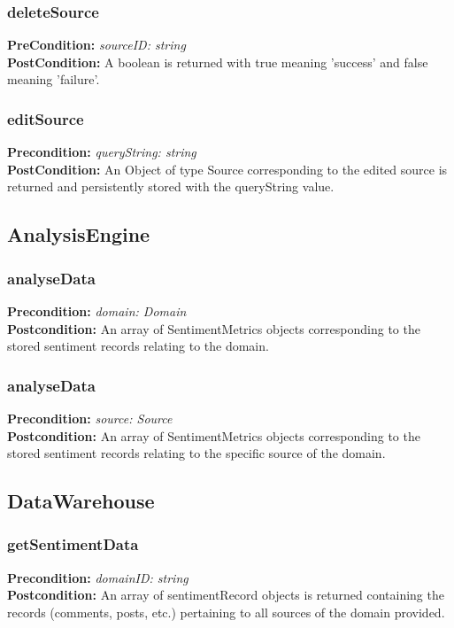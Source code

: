 \documentclass[12pt]{article}
\begin{document}
\subsubsection*{deleteSource}
\textbf{PreCondition:} \textit{sourceID: string} \\
\textbf{PostCondition:} A boolean is returned with true meaning 'success' and false meaning 'failure'.

\subsubsection*{editSource}
\textbf{Precondition:} \textit{queryString: string} \\
\textbf{PostCondition:} An Object of type Source corresponding to the edited source is returned and persistently stored with the queryString value.

\subsection{AnalysisEngine}

\subsubsection*{analyseData}
\textbf{Precondition:} \textit{domain: Domain} \\
\textbf{Postcondition:} An array of SentimentMetrics objects corresponding to the stored sentiment records relating to the domain.

\subsubsection*{analyseData}
\textbf{Precondition:} \textit{source: Source} \\
\textbf{Postcondition:} An array of SentimentMetrics objects corresponding to the stored sentiment records relating to the specific source of the domain.

\subsection{DataWarehouse}

\subsubsection*{getSentimentData}
\textbf{Precondition:} \textit{domainID: string} \\
\textbf{Postcondition:} An array of sentimentRecord objects is returned containing the records (comments, posts, etc.) pertaining to all sources of the domain provided.
\end{document}
